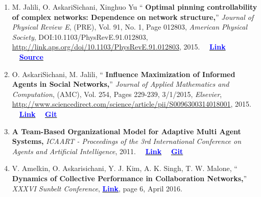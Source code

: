 \documentclass[letter]{res}
\begin{document}
\begin{resume}
\begin{enumerate}[leftmargin=-.01in]
			\item M. Jalili, O. AskariSichani, Xinghuo Yu `` \textbf{Optimal pinning controllability of complex networks: Dependence on network structure,}''
			\textit{Journal of Physical Review E}, (PRE), Vol. 91, No. 1, Page 012803,
			\textit{American Physical Society}, DOI:10.1103/PhysRevE.91.012803,\\
			\href{http://link.aps.org/doi/10.1103/PhysRevE.91.012803}{http://link.aps.org/doi/10.1103/PhysRevE.91.012803}, 2015.
			~~\href{http://link.aps.org/doi/10.1103/PhysRevE.91.012803}{\textbf{\textcolor{blue}{Link}}}
			~~\href{https://github.com/omid55/optimal_pinning_control}{\textbf{\textcolor{blue}{Source}}}
			
			\item O. AskariSichani, M. Jalili, `` \textbf{Influence Maximization of Informed Agents in Social Networks,}'' \textit{Journal of Applied Mathematics
				and Computation}, (AMC), Vol. 254, Pages 229-239, 3/1/2015, \textit{Elsevier},\\
			\href{http://www.sciencedirect.com/science/article/pii/S0096300314018001}{http://www.sciencedirect.com/science/article/pii/S0096300314018001}, 2015.
			~~\href{http://dx.doi.org/10.1016/j.amc.2014.12.139}{\textbf{\textcolor{blue}{Link}}}
			~~\href{https://github.com/omid55/influence_maximization}{\textbf{\textcolor{blue}{Git}}}
			
			
			\item \textbf{A Team-Based Organizational Model for Adaptive Multi Agent Systems,} \textit{ICAART - Proceedings of the 3rd International Conference on Agents and Artificial Intelligence}, 2011.
			~~\href{https://www.researchgate.net/publication/221539731_A_Team-based_Organizational_Model_for_Adaptive_Multi-agent_Systems}{\textbf{\textcolor{blue}{Link}}}
			~~\href{https://github.com/omid55/team_based_rescue_jade_multi_agent_system}{\textbf{\textcolor{blue}{Git}}}
			
			\item V. Amelkin, O. Askarisichani, Y. J. Kim, A. K. Singh, T. W. Malone, `` \textbf{Dynamics of Collective Performance in Collaboration Networks,}'' \textit{XXXVI Sunbelt Conference}, \href{http://insna.org/sunbelt2016/wp-content/uploads/2015/09/Sunbelt2016abstracts.pdf}{\textbf{\textcolor{blue}{Link}}}, page 6, April 2016.
			

\end{enumerate}
\end{resume}
\end{document}

